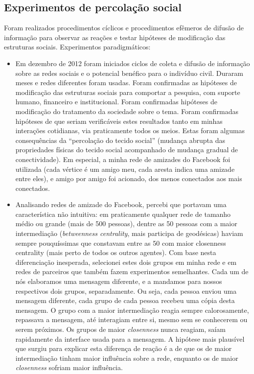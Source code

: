 \documentclass[a4paper,openright,12pt]{report} %
\begin{document}
\subsection{Experimentos de percolação social}\label{sec:exp}
Foram realizados procedimentos cíclicos e procedimentos efêmeros
de difusão de informação para observar as reações
e testar hipóteses de modificação das estruturas sociais.
Experimentos paradigmáticos:
\begin{itemize}
	\item Em dezembro de 2012 foram iniciados ciclos de
		coleta e difusão de informação sobre
		as redes sociais e o potencial benéfico para
		o indivíduo civil. Duraram meses e redes diferentes
		foram usadas. Foram confirmadas 
		as hipóteses de modificação das
		estruturas sociais para comportar a pesquisa,
		com suporte humano, financeiro e institucional.
		Foram confirmadas hipóteses de modificação
		do tratamento da sociedade sobre o tema.
		Foram confirmadas hipóteses de que seriam
		verificáveis estes resultados tanto em minhas
		interações cotidianas, via praticamente todos os meios.
		Estas foram algumas consequências da ``percolação
		do tecido social'' (mudança abrupta das propriedades físicas do tecido social
		acompanhado de mudança gradual de conectividade).
		Em especial, a minha rede de amizades do Facebook
		foi utilizada (cada vértice é um amigo meu,
		cada aresta indica uma amizade entre eles), e
		amigo por amigo foi acionado,
		dos menos conectados aos mais conectados.
	\item Analisando redes de amizade do Facebook, percebi que
		portavam uma característica não intuitiva:
		em praticamente qualquer rede de tamanho médio ou grande
		(mais de 500 pessoas), dentre as 50 pessoas com a
		maior intermediação (\emph{betweenness centrality}, mais participa de geodésicas)
		haviam sempre pouquíssimas que constavam entre as 50
		com maior closenness centrality (mais perto de todos os outros agentes). 
		Com base nesta diferenciação inesperada, selecionei estes dois grupos em minha
		rede e em redes de parceiros que também fazem experimentos semelhantes.
		Cada um de nós elaboramos uma mensagem diferente, e a mandamos
		para nossos respectivos dois grupos, separadamente. Ou seja,
		cada pessoa enviou uma mensagem diferente, cada grupo de cada pessoa
		recebeu uma cópia desta mensagem. O grupo com a maior intermediação
		reagia sempre calorosamente, repassava a mensagem, até interagiam entre si,
		mesmo sem se conhecerem ou serem próximos.
		Os grupos de maior \emph{closenness} nunca reagiam, saíam rapidamente 
		da interface usada para a mensagem. A hipótese mais plausível que surgiu
		para explicar esta diferença de reação é a de que os de maior intermediação
		tinham maior influência sobre
		a rede, enquanto os de maior \emph{closenness} sofriam maior influência.
\end{itemize}
\end{document}
